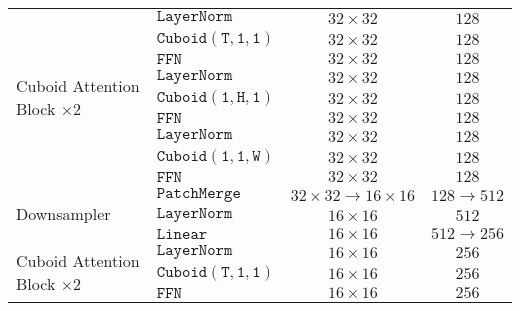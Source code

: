 \documentclass{article}
\begin{document}
\begin{table}[!tb]
\begin{center}
{\begin{tabular}{l|l|c|c}
    \multirow{9}{*}{Cuboid Attention Block $\times 2$}  & $\mathtt{LayerNorm}$      & $32\times32$                      & $128$              \\
                                                        & $\mathtt{Cuboid(T,1,1)}$  & $32\times32$                      & $128$              \\
                                                        & $\mathtt{FFN}$            & $32\times32$                      & $128$              \\
                                                        & $\mathtt{LayerNorm}$      & $32\times32$                      & $128$              \\
                                                        & $\mathtt{Cuboid(1,H,1)}$  & $32\times32$                      & $128$              \\
                                                        & $\mathtt{FFN}$            & $32\times32$                      & $128$              \\
                                                        & $\mathtt{LayerNorm}$      & $32\times32$                      & $128$              \\
                                                        & $\mathtt{Cuboid(1,1,W)}$  & $32\times32$                      & $128$              \\
                                                        & $\mathtt{FFN}$            & $32\times32$                      & $128$              \\\hline
    \multirow{3}{*}{Downsampler}                        & $\mathtt{PatchMerge}$     & $32\times32\rightarrow16\times16$ & $128\rightarrow512$\\
                                                        & $\mathtt{LayerNorm}$      & $16\times16$                      & $512$             \\
                                                        & $\mathtt{Linear}$         & $16\times16$                      & $512\rightarrow256$\\\hline  
    \multirow{9}{*}{Cuboid Attention Block $\times 2$}  & $\mathtt{LayerNorm}$      & $16\times16$                      & $256$             \\
                                                        & $\mathtt{Cuboid(T,1,1)}$  & $16\times16$                      & $256$             \\
                                                        & $\mathtt{FFN}$            & $16\times16$                      & $256$             \\

\end{tabular}}
\end{center}
\end{table}
\end{document}
